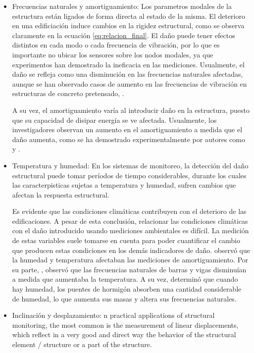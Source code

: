     \begin{itemize}
        \item Frecuencias naturales y amortiguamiento: Los parametros modales de la estructura están ligados de forma directa al estado de la misma. El deterioro en una edificiación induce cambios en la rigidez estructural, como se observa claramente en la ecuación \ref{eq:relacion_final}. El daño puede tener efectos distintos en cada modo o cada frecuencia de vibración, por lo que es importante no ubicar los sensores sobre los nodos modales, ya que experimentos han demostrado la ineficacia en las mediciones. Usualmente, el daño se refleja como una disminución en las frecuencias naturales afectadas, aunque se han observado casos de aumento en las frecuencias de vibración en estructuras de concreto pretensado, \citep{rytter1993vibration}.
        
        A su vez, el amortiguamiento varía al introducir daño en la estructura, puesto que su capacidad de disipar energía se ve afectada. Usualmente, los investigadores observan un aumento en el amortiguamiento a medida que el daño aumenta, como se ha demostrado experimentalmente por autores como \citet{hearn1991modal} y \citet{rytter1993vibration}.

        \item Temperatura y humedad: En los sistemas de monitoreo, la detección del daño estructural puede tomar períodos de tiempo considerables, durante los cuales las caracterpisticas sujetas a temperatura y humedad, sufren cambios que afectan la respuesta estructural.
                
        Es evidente que las condiciones climáticas contribuyen con el deterioro de las edificaciones. A pesar de esta conclusión, relacionar las condiciones climáticas con el daño introducido usando mediciones ambientales es difícil. La medición de estas variables suele tomarse en cuenta para poder cuantificar el cambio que producen estas condiciones en los demás indicadores de daño. \citet{rytter1993vibration} observó que la humedad y temperatura afectaban las mediciones de amortiguamiento. Por su parte, \citet{mohamed2014}, observó que las frecuencias naturales de barras y vigas disminuían a medida que aumentaba la temperatura. A su vez, \citet{sohn2007effects} determinó que cuando hay humedad, los puentes de hormigón absorben una cantidad considerable de humedad, lo que aumenta sus masas y altera sus frecuencias naturales.
        
        \item Inclinación y desplazamiento: n practical applications of structural monitoring, the most common is the measurement of linear displacements, which reflect in a very good and direct way the behavior of the structural element / structure or a part of the structure.
        

\end{itemize}
